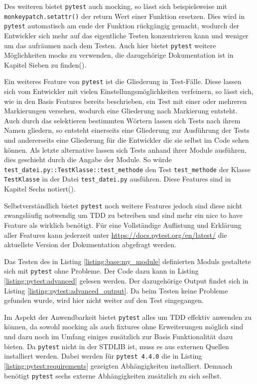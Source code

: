Des weiteren bietet \lstinline{pytest} auch \gls{mock}ing, so lässt sich
beispielsweise mit \lstinline{monkeypatch.setattr()} der return Wert einer
Funktion ersetzen. Dies wird in \lstinline{pytest} automatisch am ende der
Funktion rückgängig gemacht, wodurch der Entwickler sich mehr auf das
eigentliche Testen konzentrieren kann und weniger um das aufräumen nach dem
Testen.
Auch hier bietet \lstinline{pytest} weitere Möglichkeiten \Glspl{mock} zu
verwenden, die dazugehörige Dokumentation ist in Kapitel Sieben zu
finden(\cite{docs.pytest.org:4.4}).
\newline

Ein weiteres Feature von \lstinline{pytest} ist die Gliederung in Test-Fälle.
Diese lassen sich vom Entwickler mit vielen Einstellungsmöglichkeiten
verfeinern, so lässt sich, wie in den Basis Features bereits beschrieben, ein
Test mit einer oder mehreren Markierungen versehen, wodurch eine Gliederung nach
Markierung entsteht. Auch durch das selektieren bestimmten Wörtern lassen sich
Tests nach ihrem Namen gliedern, so entsteht einerseits eine Gliederung zur
Ausführung der Tests und andererseits eine Gliederung für die Entwickler die sie
selbst im Code sehen können. Als letzte alternative lassen sich Tests anhand
ihrer Module ausführen, dies geschieht durch die Angabe der Module. So würde
\lstinline{test_datei.py::TestKlasse::test_methode} den Test
\lstinline{test_methode} der Klasse \lstinline{TestKlasse} in der Datei
\lstinline{test_datei.py} ausführen.
Diese Features sind in Kapitel Sechs notiert(\cite{docs.pytest.org:4.4}).
\newline

Selbstverständlich bietet \lstinline{pytest} noch weitere Features jedoch sind
diese nicht zwangsläufig notwendig um TDD zu betreiben und sind mehr ein nice to
have Feature als wirklich benötigt. Für eine Vollständige Auflistung und
Erklärung aller Features kann jederzeit unter
\url{https://docs.pytest.org/en/latest/} die aktuellste Version der
Dokumentation abgefragt werden.
\newline

Das Testen des in Listing \ref{listing:base:my_module} definierten Moduls
gestaltete sich mit \lstinline{pytest} ohne Probleme. Der Code dazu kann in
Listing \ref{listing:pytest:advanced} gelesen werden. Der dazugehörige Output
findet sich in Listing \ref{listing:pytest:advanced_output}. Da beim Testen
keine Probleme gefunden wurde, wird hier nicht weiter auf den Test eingegangen.

Im Aspekt der Anwendbarkeit bietet \lstinline{pytest} alles um TDD effektiv
anwenden zu können, da sowohl \gls{mock}ing als auch \Glspl{fixture} ohne
Erweiterungen möglich sind und dazu noch im Umfang einiges zusätzlich zur
Basis Funktionalität dazu bieten.
Da \lstinline{pytest} nicht in der STDLIB ist, muss es aus externen Quellen
installiert werden. Dabei werden für \lstinline{pytest 4.4.0} die in Listing
\ref{listing:pytest:requirements} gezeigten Abhängigkeiten installiert. Demnach
benötigt \lstinline{pytest} sechs externe Abhängigkeiten zusätzlich zu sich
selbst.

